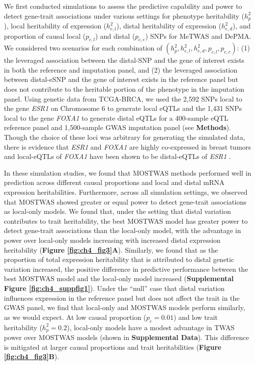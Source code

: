 We first conducted simulations to assess
the predictive capability
and power to detect
gene-trait associations
under various settings
for phenotype heritability ($h^2_p$),
local heritability of expression ($h^2_{e,l}$),
distal heritability of expression ($h^2_{e,d}$),
and proportion of causal local ($p_{c,l}$)
and distal ($p_{c,e}$) SNPs
for MeTWAS and DePMA.
We considered two scenarios for each
combination of $(h^2_p, h^2_{e,l}, h^2_{e,d}, p_{c,l},
p_{c,e})$: (1) the leveraged association
between the distal-SNP and the gene of interest
exists in both the reference
and imputation panel, and (2) the leveraged association 
between distal-eSNP and the gene of interest
exists in the reference panel but does not contribute
to the heritable portion of the phenotype
in the imputation panel.
Using genetic data
from TCGA-BRCA, we used the 2,592 SNPs local to
the gene \emph{ESR1} 
on Chromosome 6 
to generate local eQTLs and
the 1,431 SNPs
local to the gene \emph{FOXA1}
to generate distal eQTLs for
a 400-sample eQTL reference panel
and 1,500-sample GWAS imputation
panel (see \textbf{Methods}).
Though the choice of these loci
was arbitrary for generating the simulated data, there
is evidence that \textit{ESR1} and 
\textit{FOXA1} are highly co-expressed in breast tumors
and local-eQTLs of \textit{FOXA1} have been
shown to be distal-eQTLs of \textit{ESR1} \cite{Guo2018AStudies}.

In these simulation studies, we found that
MOSTWAS methods performed well in
prediction across different
causal proportions and local and distal
mRNA expression heritabilities.
Furthermore, across all simulation
settings, we observed that MOSTWAS
showed greater or equal power
to detect gene-trait associations
as local-only models.
We found that, under
the setting that distal variation
contributes to trait heritability,
the best MOSTWAS model has greater power
to detect gene-trait associations
than the local-only model, with
the advantage in power over local-only
models increasing with increased distal
expression heritability (\textbf{Figure \ref{fig:ch4_fig3}A}).
Similarly, we found that as the proportion
of total expression heritability that
is attributed to distal genetic variation increased,
the positive difference in predictive performance
between the best MOSTWAS model and the local-only model
increased (\textbf{Supplemental Figure \ref{fig:ch4_suppfig1}}).
Under the ``null'' case that distal
variation influences expression
in the reference panel but
does not affect the trait in the GWAS panel,
we find that local-only and MOSTWAS models
perform similarly, as we would expect.
At low causal proportion
($p_c = 0.01$)
and low trait heritability ($h^2_p = 0.2$), 
local-only models have a
modest advantage in TWAS power over MOSTWAS models (shown
in \textbf{Supplemental Data}).
This difference is mitigated at larger
causal proportions and trait heritabilities
 (\textbf{Figure \ref{fig:ch4_fig3}B}).
 
